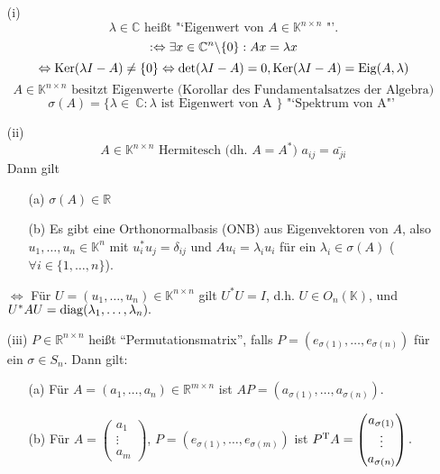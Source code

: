 \begin{enumerate}
\item[(i)]
\[
\lambda \in \mathbb{C}\text{ heißt "`Eigenwert von } A \in 
\mathbb{K}^{n \times n} \text{ "'.} \]
\[
: \Leftrightarrow \exists x \in \mathbb{C}^n \backslash \{0\}: Ax = \lambda x \\
\]\[
\Leftrightarrow \operatorname*{\mathrm{Ker}} (\lambda I -A) \neq \{0\} \Leftrightarrow 
\det (\lambda I -A) = 0, \operatorname*{\mathrm{Ker}} (\lambda I-A) = \operatorname*{\mathrm{Eig}}(A, \lambda)
\]\[
A \in \mathbb{K}^{n \times n} \text{ besitzt Eigenwerte (Korollar des 
Fundamentalsatzes der Algebra)}
\]\[
\sigma (A) = \{ \lambda \in~ \mathbb{C}: \lambda \text{ ist Eigenwert 
von A } \} \text{ "`Spektrum von A"' }
\]
\item[(ii)]
\[
A \in \mathbb{K}^{n \times n} \text{ Hermitesch (dh. } A = A^\ast \text{) } a_{ij} = \bar{a_{ji}}
\]
Dann gilt 
\begin{enumerate}
\item[(a)]
$ \sigma(A) \in \mathbb{R}$
\item[(b)]
Es gibt eine Orthonormalbasis (ONB) aus Eigenvektoren von $A$, also  $u_1, \dots, u_n \in \mathbb{K}^n$ mit $u_i^{*} u_j = \delta_{ij}$
und $Au_i = \lambda_i u_i$ für ein $\lambda_i \in \sigma(A)$
($\forall i \in \{1, \dots, n\}$).
\end{enumerate}
$\Leftrightarrow$ Für $U = (u_1, \dots, u_n) \in \mathbb{K}^{n\times n}$ gilt $U^\ast U = I$,
d.h. $U \in O_n(\mathbb{K})$, und 
$U^\ast A U = \operatorname*{\mathrm{diag}}(\lambda_1, \dots, \lambda_n).$
\item[(iii)]
$P \in \mathbb{R}^{n \times n}$ heißt "`Permutationsmatrix"',
falls $P=(e_{\sigma(1)}, \dots, e_{\sigma(n)})$ für ein $\sigma \in S_n$.
Dann gilt:
\begin{enumerate}
  \item[(a)] Für $A = (a_1, \dots, a_n) \in \mathbb{R}^{m \times n}$ ist
  $AP = (a_{\sigma(1)},\dots, a_{\sigma(n)}).$
  \item[(b)]
  Für $A = \begin{pmatrix} a_1 \\ \vdots \\ a_m \end{pmatrix}$,
      $P = (e_{\sigma(1)}, \dots, e_{\sigma(m)})$
  ist $P^\mathrm T A = \begin{pmatrix} a_{\sigma(1)} \\ \vdots \\ a_{\sigma(n)} \end{pmatrix}.$
\end{enumerate}
\end{enumerate}